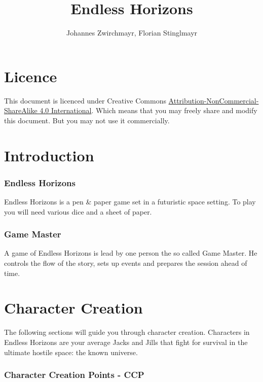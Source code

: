 \documentclass[11pt,a4paper,openany]{scrbook}
\begin{document}
\title{Endless Horizons}
\author{Johannes Zwirchmayr, Florian Stinglmayr}
\maketitle

\chapter{Licence}

  This document is licenced under Creative Commons
  \href{http://creativecommons.org/licenses/by-nc-sa/4.0/}
       {Attribution-NonCommercial-ShareAlike 4.0 International}.
  Which means that you may freely share and modify this document.
  But you may not use it commercially.

\chapter{Introduction}

\subsection{Endless Horizons}

Endless Horizons is a pen \& paper game set in a futuristic space setting. To
play you will need various dice and a sheet of paper.

\subsection{Game Master}

A game of Endless Horizons is lead by one person the so called Game Master.
He controls the flow of the story, sets up events and prepares the
session ahead of time.

\chapter{Character Creation}

The following sections will guide you through character creation. Characters
in Endless Horizons are your average Jacks and Jills that fight for survival
in the ultimate hostile space: the known universe.

\subsection{Character Creation Points - CCP}
\end{document}
